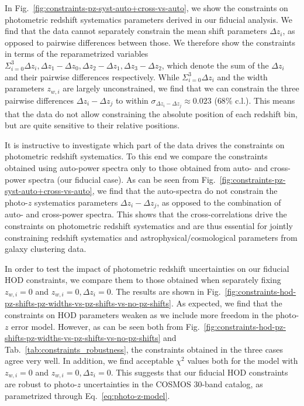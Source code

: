\documentclass[a4paper,11pt]{article}
\begin{document}
      In Fig.~\ref{fig:constraints-pz-syst-auto+cross-vs-auto}, we show the constraints on photometric redshift systematics parameters derived in our fiducial analysis. We find that the data cannot separately constrain the mean shift parameters $\Delta z_{i}$, as opposed to pairwise differences between those. We therefore show the constraints in terms of the reparametrized variables $\Sigma_{i=0}^{3} \Delta z_{i}, \Delta z_{1} - \Delta z_{0}, \Delta z_{2} - \Delta z_{1}, \Delta z_{3} - \Delta z_{2}$, which denote the sum of the $\Delta z_{i}$ and their pairwise differences respectively. While $\Sigma_{i=0}^{3} \Delta z_{i}$ and the width parameters $z_{w, i}$ are largely unconstrained, we find that we can constrain the three pairwise differences $\Delta z_{i} - \Delta z_{j}$ to within $\sigma_{\Delta z_{i} - \Delta z_{j}} \approx 0.023$ ($68 \%$ c.l.). This means that the data do not allow constraining the absolute position of each redshift bin, but are quite sensitive to their relative positions.

      It is instructive to investigate which part of the data drives the constraints on photometric redshift systematics. To this end we compare the constraints obtained using auto-power spectra only to those obtained from auto- and cross-power spectra (our fiducial case). As can be seen from Fig.~\ref{fig:constraints-pz-syst-auto+cross-vs-auto}, we find that the auto-spectra do not constrain the photo-$z$ systematics parameters $\Delta z_{i} - \Delta z_{j}$, as opposed to the combination of auto- and cross-power spectra. This shows that the cross-correlations drive the constraints on photometric redshift systematics and are thus essential for jointly constraining redshift systematics and astrophysical/cosmological parameters from galaxy clustering data.

      In order to test the impact of photometric redshift uncertainties on our fiducial HOD constraints, we compare them to those obtained when separately fixing $z_{w, i} = 0$ and $z_{w, i} = 0, \Delta z_{i} = 0$. The results are shown in Fig.~\ref{fig:constraints-hod-pz-shifts-pz-widths-vs-pz-shifts-vs-no-pz-shifts}. As expected, we find that the constraints on HOD parameters weaken as we include more freedom in the photo-$z$ error model. However, as can be seen both from Fig.~\ref{fig:constraints-hod-pz-shifts-pz-widths-vs-pz-shifts-vs-no-pz-shifts} and Tab.~\ref{tab:constraints_robustness}, the constraints obtained in the three cases agree very well. In addition, we find acceptable $\chi^{2}$ values both for the model with $z_{w, i} = 0$ and $z_{w, i} = 0, \Delta z_{i} = 0$. This suggests that our fiducial HOD constraints are robust to photo-$z$ uncertainties in the COSMOS 30-band catalog, as parametrized through Eq.~\ref{eq:photo-z-model}. 
\end{document}
